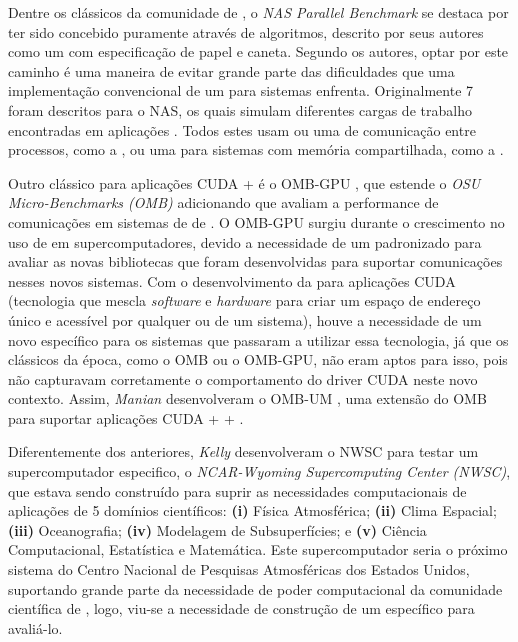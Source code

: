 Dentre os \benchs clássicos da comunidade de \HPC, o \textit{NAS Parallel Benchmark} \cite{baileynasbench} se destaca por ter sido concebido puramente através de algoritmos, descrito por seus autores como um \bench com especificação de papel e caneta. Segundo os autores, optar por este caminho é uma maneira de evitar grande parte das dificuldades que uma implementação convencional de um \bench para sistemas \HPC enfrenta. Originalmente 7  foram descritos para o NAS, os quais simulam diferentes cargas de trabalho encontradas em aplicações \HPC. Todos estes  usam ou uma \API de comunicação entre processos, como a \MPI, ou uma \API para sistemas com memória compartilhada, como a \OpenMP.

Outro \bench clássico para aplicações CUDA + \MPI é o OMB-GPU \cite{bureddyomb}, que estende o \textit{OSU Micro-Benchmarks (OMB)} adicionando  que avaliam a performance de comunicações \MPI em sistemas de \clusters de \GPUs. O OMB-GPU surgiu durante o crescimento no uso de \GPUs em supercomputadores, devido a necessidade de um \bench padronizado para avaliar as novas bibliotecas \MPI que foram desenvolvidas para suportar comunicações \MPI nesses novos sistemas. Com o desenvolvimento da \UM para aplicações CUDA (tecnologia que mescla \textit{software} e \textit{hardware} para criar um espaço de endereço único e acessível por qualquer \GPU ou \CPU de um sistema), houve a necessidade de um novo \bench específico para os sistemas que passaram a utilizar essa tecnologia, já que os \benchs clássicos da época, como o OMB ou o OMB-GPU, não eram aptos para isso, pois não capturavam corretamente o comportamento do driver CUDA neste novo contexto. Assim, \textit{Manian} \etal desenvolveram o OMB-UM \cite{maniancudaum}, uma extensão do OMB para suportar aplicações CUDA + \MPI + \UM.

Diferentemente dos \benchs anteriores, \textit{Kelly} \etal \cite{kellynwsc} desenvolveram o \bench NWSC para testar um supercomputador especifico, o \textit{NCAR-Wyoming Supercomputing Center (NWSC)}, que estava sendo construído para suprir as necessidades computacionais de aplicações \HPC de 5 domínios científicos: \textbf{(i)} Física Atmosférica; \textbf{(ii)} Clima Espacial; \textbf{(iii)} Oceanografia; \textbf{(iv)} Modelagem de Subsuperfícies; e \textbf{(v)} Ciência Computacional, Estatística e Matemática. Este supercomputador seria o próximo sistema \HPC do Centro Nacional de Pesquisas Atmosféricas dos Estados Unidos, suportando grande parte da necessidade de poder computacional da comunidade científica de \HPC, logo, viu-se a necessidade de construção de um \bench específico para avaliá-lo.


